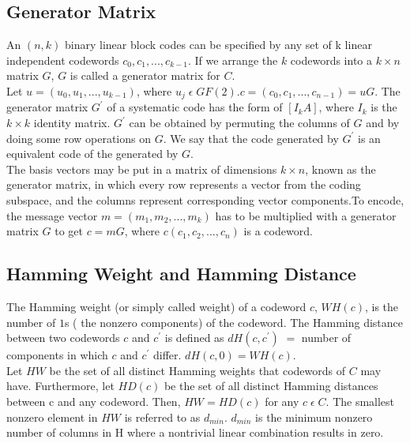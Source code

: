 \documentclass{report}
\begin{document}
\subsection*{Generator Matrix}
\begin{sloppy}
An $(n, k)$ binary linear block codes can be specified by any set of k linear independent codewords $c_0,c_1,. . . ,c_{k-1}$. If we arrange the $k$ codewords into a $k \times n$ matrix $G$, $G$ is called a generator matrix for $C$.\\

Let $u = (u_0,u_1,...,u_{k-1})$, where $u_j \;\epsilon\; GF(2)$$. $$c = (c_0,c_1,. . . ,c_{n-1})= uG$.
The generator matrix $G^{'}$ of a systematic code has the form of $[I_kA]$, where $I_k$ is the $k \times k$ identity matrix. $G^{'}$ can be obtained by permuting the columns of $G$ and by doing some row operations on $G$. We say that the code generated by $G^{'}$ is an equivalent code of the generated by $G$.\\

The basis vectors may be put in a matrix of dimensions $k \times n$, known as the generator matrix, in which every row represents a vector from the coding subspace, and the columns represent corresponding vector components.To encode, the message vector $m = (m_1, m_2,...,m_k)$ has to be multiplied with a generator matrix $G$ to get $c = mG$, where $c(c_1, c_2,...,c_n)$ is a codeword.\\

\subsection*{Hamming Weight and Hamming Distance}
The Hamming weight (or simply called weight) of a codeword $c$, $WH(c)$, is the number of $1$s ( the nonzero components) of the codeword.
The Hamming distance between two codewords $c$ and $c^{'}$ is defined as $dH(c, c^{'})$ $=$ number of components in which $c$ and $c^{'}$ differ.
$dH(c,0)=WH(c)$.\\

Let $HW$ be the set of all distinct Hamming weights that codewords of $C$ may have. Furthermore, let $HD(c)$ be the set of all distinct Hamming distances between c and any codeword. Then, $HW =HD(c)$ for any $c\; \epsilon\; C$. The smallest nonzero element in $HW$ is referred to as $d_{min}$.
$d_{min}$ is the minimum nonzero number of columns in H where a nontrivial linear combination results in zero.

\end{sloppy}
\end{document}

